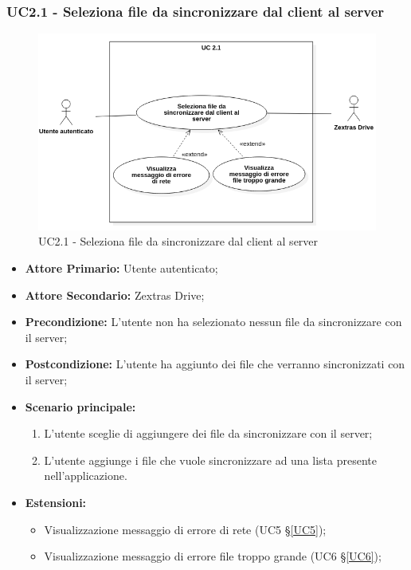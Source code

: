 \subsubsection{UC2.1 - Seleziona file da sincronizzare dal client al server}
\begin{figure}[H]
    \centering
    \includegraphics[scale = 0.6]{components/img/UC2_1.png}
    \caption{UC2.1 - Seleziona file da sincronizzare dal client al server}
\end{figure}
\begin{itemize}
\item \textbf{Attore Primario:} Utente autenticato;
\item \textbf{Attore Secondario:} Zextras Drive;
\item \textbf{Precondizione:} L'utente non ha selezionato nessun file da sincronizzare con il server;
\item \textbf{Postcondizione:} L'utente ha aggiunto dei file che verranno sincronizzati con il server;
\item \textbf{Scenario principale:}
    \begin{enumerate}
    \item L'utente sceglie di aggiungere dei file da sincronizzare con il server;
    \item L'utente aggiunge i file che vuole sincronizzare ad una lista presente nell'applicazione.
    \end{enumerate}
\item \textbf{Estensioni:}
    \begin{itemize}
    \item Visualizzazione messaggio di errore di rete (UC5 \S{}\ref{UC5});
    \item Visualizzazione messaggio di errore file troppo grande (UC6 \S{}\ref{UC6});
    \end{itemize}
\end{itemize}

